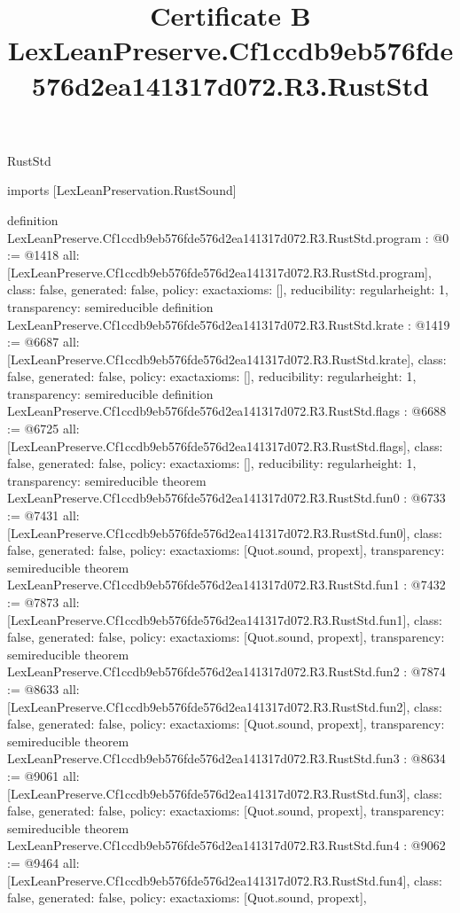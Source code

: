 \begin{lexlean}{RustStd}
\title{Certificate B LexLeanPreserve.Cf1ccdb9eb576fde576d2ea141317d072.R3.RustStd}
\begin{coremodule}
imports [LexLeanPreservation.RustSound]

definition LexLeanPreserve.Cf1ccdb9eb576fde576d2ea141317d072.R3.RustStd.program : @0 := @1418 {
  all: [LexLeanPreserve.Cf1ccdb9eb576fde576d2ea141317d072.R3.RustStd.program],
  class: false,
  generated: false,
  policy: exact{axioms: []},
  reducibility: regular{height: 1},
  transparency: semireducible
}
definition LexLeanPreserve.Cf1ccdb9eb576fde576d2ea141317d072.R3.RustStd.krate : @1419 := @6687 {
  all: [LexLeanPreserve.Cf1ccdb9eb576fde576d2ea141317d072.R3.RustStd.krate],
  class: false,
  generated: false,
  policy: exact{axioms: []},
  reducibility: regular{height: 1},
  transparency: semireducible
}
definition LexLeanPreserve.Cf1ccdb9eb576fde576d2ea141317d072.R3.RustStd.flags : @6688 := @6725 {
  all: [LexLeanPreserve.Cf1ccdb9eb576fde576d2ea141317d072.R3.RustStd.flags],
  class: false,
  generated: false,
  policy: exact{axioms: []},
  reducibility: regular{height: 1},
  transparency: semireducible
}
theorem LexLeanPreserve.Cf1ccdb9eb576fde576d2ea141317d072.R3.RustStd.fun0 : @6733 := @7431 {
  all: [LexLeanPreserve.Cf1ccdb9eb576fde576d2ea141317d072.R3.RustStd.fun0],
  class: false,
  generated: false,
  policy: exact{axioms: [Quot.sound, propext]},
  transparency: semireducible
}
theorem LexLeanPreserve.Cf1ccdb9eb576fde576d2ea141317d072.R3.RustStd.fun1 : @7432 := @7873 {
  all: [LexLeanPreserve.Cf1ccdb9eb576fde576d2ea141317d072.R3.RustStd.fun1],
  class: false,
  generated: false,
  policy: exact{axioms: [Quot.sound, propext]},
  transparency: semireducible
}
theorem LexLeanPreserve.Cf1ccdb9eb576fde576d2ea141317d072.R3.RustStd.fun2 : @7874 := @8633 {
  all: [LexLeanPreserve.Cf1ccdb9eb576fde576d2ea141317d072.R3.RustStd.fun2],
  class: false,
  generated: false,
  policy: exact{axioms: [Quot.sound, propext]},
  transparency: semireducible
}
theorem LexLeanPreserve.Cf1ccdb9eb576fde576d2ea141317d072.R3.RustStd.fun3 : @8634 := @9061 {
  all: [LexLeanPreserve.Cf1ccdb9eb576fde576d2ea141317d072.R3.RustStd.fun3],
  class: false,
  generated: false,
  policy: exact{axioms: [Quot.sound, propext]},
  transparency: semireducible
}
theorem LexLeanPreserve.Cf1ccdb9eb576fde576d2ea141317d072.R3.RustStd.fun4 : @9062 := @9464 {
  all: [LexLeanPreserve.Cf1ccdb9eb576fde576d2ea141317d072.R3.RustStd.fun4],
  class: false,
  generated: false,
  policy: exact{axioms: [Quot.sound, propext]},
}
\end{coremodule}
\end{lexlean}
